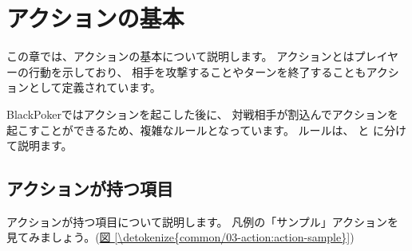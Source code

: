 \documentclass[letterpaper,10pt,dvipdfmx]{sphinxmanual}
\begin{document}
\section{アクションの基本}
\label{\detokenize{common/03-action:id1}}\label{\detokenize{common/03-action::doc}}
この章では、アクションの基本について説明します。
アクションとはプレイヤーの行動を示しており、
相手を攻撃することやターンを終了することもアクションとして定義されています。

BlackPokerではアクションを起こした後に、
対戦相手が割込んでアクションを起こすことができるため、複雑なルールとなっています。
ルールは、 {\hyperref[\detokenize{common/03-action::doc}]{}} と {\hyperref[\detokenize{common/05-action_detail::doc}]{}} に分けて説明ます。


\subsection{アクションが持つ項目}
\label{\detokenize{common/03-action:id2}}
アクションが持つ項目について説明します。
凡例の「サンプル」アクションを見てみましょう。(\hyperref[\detokenize{common/03-action:action-sample}]{図 \ref{\detokenize{common/03-action:action-sample}}})
\end{document}
